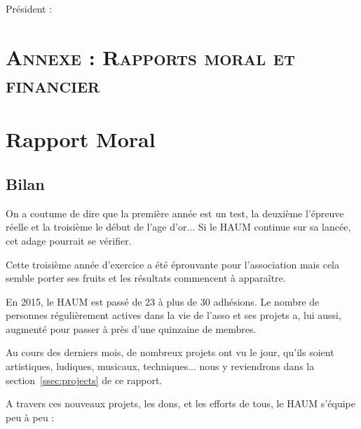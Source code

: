 \documentclass[a4paper, 11pt]{article}
\begin{document}
Président :



\newpage

\section*{\textsc{Annexe : Rapports moral et financier}}
\section{Rapport Moral}


\subsection{Bilan}

On a coutume de dire que la première année est un test, la deuxième l'épreuve réelle et la troisième le début de l'age
d'or... Si le HAUM continue sur sa lancée, cet adage pourrait se vérifier.

Cette troisième année d'exercice a été éprouvante pour l'association mais cela semble porter ses fruits et les résultats
commencent à apparaître.

En 2015, le HAUM est passé de 23 à plus de 30 adhésions. Le nombre de personnes régulièrement actives dans la vie de l'asso
et ses projets a, lui aussi, augmenté pour passer à près d'une quinzaine de membres.

Au cours des derniers mois, de nombreux projets ont vu le jour, qu'ils soient artistiques, ludiques, musicaux,
techniques... nous y reviendrons dans la section~\ref{ssec:projects} de ce rapport.

A travers ces nouveaux projets, les dons, et les efforts de tous, le HAUM s'équipe peu à peu :
\end{document}
